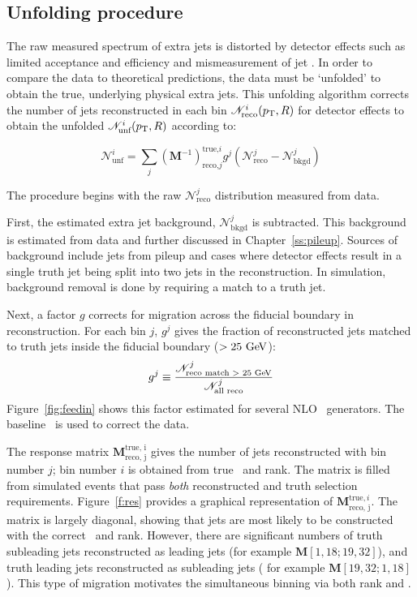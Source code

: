 \subsection{Unfolding procedure}
\label{ss:unfproc}
The raw measured spectrum of extra jets is distorted by detector effects such as limited acceptance and efficiency and mismeasurement of jet \pt. 
In order to compare the data to theoretical predictions, the data must be `unfolded' to obtain the true, underlying physical extra jets. This unfolding algorithm corrects the number of jets reconstructed in each bin ${\mathscr N}^i_{\textrm {reco} }(p_{\text{T}},R)$ for detector effects to obtain the unfolded ${\mathscr N}^i_{\textrm{unf} }(p_{\text{T}},R)$ according to:

\begin{equation}
{\mathscr N}^i_{\textrm {unf}}= \sum_j \left ({\mathbf M}^{-1} \right )_{\textrm{reco,} j}^{\textrm{true,} i} g^j \left ({\mathscr N}^j_{\textrm {reco}}-{\mathscr N}^j_{\textrm{bkgd}}\right )
\label{eqn:unf}
\end{equation}

\noindent
The procedure begins with the raw ${\mathscr N}^j_{\textrm {reco}}$ distribution measured from data. 

First, the estimated extra jet background, ${\mathscr N}^j_{\textrm{bkgd}}$ is subtracted. This background is estimated from data and further discussed in Chapter~\ref{ss:pileup}. Sources of background  include jets from pileup and cases where
detector effects result in a single truth jet being split into 
two jets in the reconstruction. In simulation, background removal is done by requiring a match to a truth jet. 

Next, a factor $g$ corrects for migration across the fiducial boundary in reconstruction. For each bin $j$, $g^j$ gives the fraction of reconstructed jets matched to truth jets inside the fiducial boundary ($>25 \gev$):
\begin{displaymath}
g^j \equiv \frac{{\mathscr N}^j_{\textrm {reco match > 25 \gev}}} {{\mathscr N}^j_{\textrm {all reco}}}
\label{eqn:feedin}
\end{displaymath}
Figure~\ref{fig:feedin} shows this factor estimated for several NLO \ttbar\ generators. The baseline \powpy\ is used to correct the data.

The response matrix ${\mathbf M}_{\textrm{reco, j}}^{\textrm{true, i}}$ gives the number of jets reconstructed with bin number $j$; bin number $i$ is obtained from true \pt\ and rank.
The matrix is 
filled from simulated events that pass \textit{ both} reconstructed and truth selection requirements.
Figure~\ref{f:res} provides a graphical representation of ${\mathbf M}_{\textrm{reco, j}}^{\textrm{true}, i}$. 
The matrix is largely diagonal, showing that jets are most likely to be constructed with the correct \pt\ and rank.
However, there are significant numbers of truth subleading jets reconstructed as leading jets (for example ${\mathbf M}[1,18; 19,32]$), and 
truth leading jets reconstructed as subleading jets ( for example ${\mathbf M}[19,32;1,18]$). This type of migration motivates the simultaneous binning via both rank and \pt.




